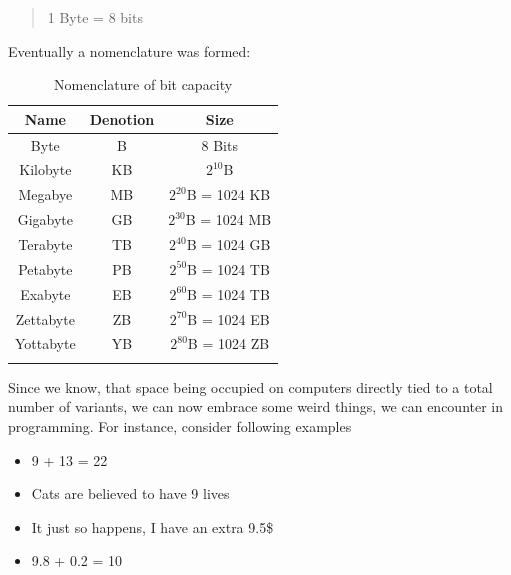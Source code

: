 \documentclass{article}
\begin{document}
            \begin{quote}
                \begin{center}
                    1 Byte = 8 bits                                    
                \end{center}
            \end{quote}

            Eventually a nomenclature was formed: 


            \begin{table}[h]
                \centering
                \begin{longtable}{ccc}
                    \toprule
                    Name & Denotion & Size \\
                    \toprule
                    Byte & B & 8 Bits \\
                    Kilobyte & KB & $2^{10}$B \\
                    Megabye & MB & $2^{20}$B = 1024 KB \\
                    Gigabyte & GB & $2^{30}$B = 1024 MB \\
                    Terabyte & TB & $2^{40}$B = 1024 GB \\
                    Petabyte & PB & $2^{50}$B = 1024 TB \\
                    Exabyte & EB & $2^{60}$B = 1024 TB \\
                    Zettabyte & ZB & $2^{70}$B = 1024 EB \\
                    Yottabyte & YB & $2^{80}$B = 1024 ZB \\
                    \bottomrule
                    \caption{Nomenclature of bit capacity}
                \end{longtable}
            \end{table}

            Since we know, that space being occupied on computers directly tied to a total number of variants, we can now embrace some weird things, we can encounter
            in programming. For instance, consider following examples

            \begin{itemize}
                \item 9 + 13 = 22
                \item Cats are believed to have 9 lives
                \item It just so happens, I have an extra 9.5\$
                \item 9.8 + 0.2 = 10
            \end{itemize}
\end{document}
